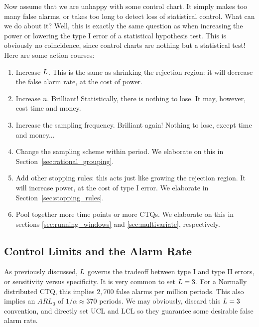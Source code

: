 Now assume that we are unhappy with some control chart. 
It simply makes too many false alarms, or takes too long to detect loss of statistical control.
What can we do about it?
Well, this is exactly the same question as when increasing the power or lowering the type I error of a statistical hypothesis test. This is obviously no coincidence, since control charts are nothing but a statistical test!
Here are some action courses:
\begin{enumerate}
\item Increase $L$. This is the same as shrinking the rejection region: 
it will decrease the false alarm rate, at the cost of power.
\item Increase $n$. Brilliant! Statistically, there is nothing to lose. It may, however, cost time and money.
\item Increase the sampling frequency. Brilliant again! Nothing to lose, except time and money...
\item Change the sampling scheme within period. We elaborate on this in Section~\ref{sec:rational_grouping}.
\item Add other stopping rules: 
this acts just like growing the rejection region. It will increase power, at the cost of type I error. We elaborate in Section~\ref{sec:stopping_rules}.
\item Pool together more time points or more CTQs. We elaborate on this in sections \ref{sec:running_windows} and  \ref{sec:multivariate}, respectively. 
\end{enumerate}






\subsection{Control Limits and the Alarm Rate}
As previously discussed, $L$ governs the tradeoff between type I and type II errors, or sensitivity versus specificity.
It is very common to set $L=3$. 
For a Normally distributed CTQ, this implies $2,700$ false alarms per million periods. 
This also implies an $ARL_0$ of $1/\alpha \approx 370$ periods.
We may obviously, discard this $L=3$ convention, and directly set UCL and LCL so they guarantee some desirable false alarm rate. 

